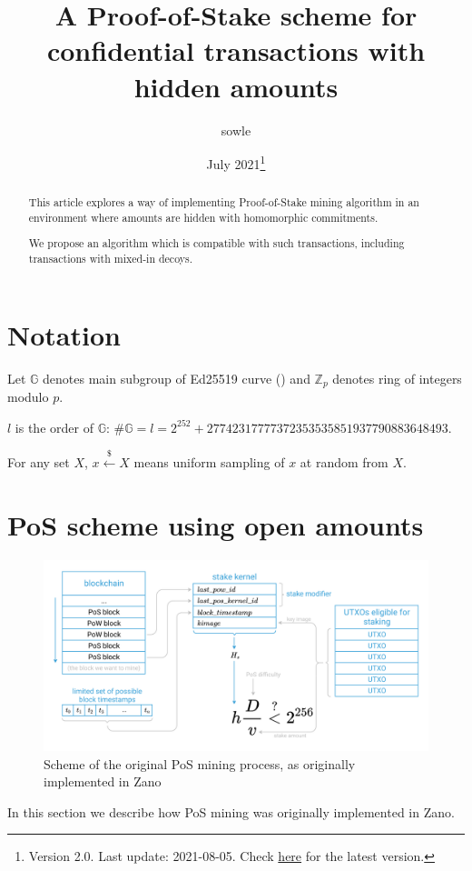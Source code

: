 \documentclass{article}
\title{\huge{\textbf{A Proof-of-Stake scheme for confidential transactions with hidden amounts}}}
\author{\large{sowle}}
\affil{\small{Zano project \\ \texttt{val@zano.org} \\ \url{https://zano.org}}}
\date{\small{July 2021\footnote{Version 2.0. Last update: 2021-08-05. Check \href{https://github.com/hyle-team/docs/tree/master/PoS/PoS_with_HA}{here} for the latest version.}}}
\numberwithin{figure}{section}
\begin{document}
\maketitle

\begin{abstract}
This article explores a way of implementing Proof-of-Stake mining algorithm in an environment where amounts are hidden with homomorphic commitments.

We propose an algorithm which is compatible with such transactions, including transactions with mixed-in decoys.
\end{abstract}

\section{Notation}
Let $\mathbb{G}$ denotes main subgroup of Ed25519 curve (\cite{ed25519_site}) and $\mathbb{Z}_p$ denotes ring of integers modulo $p$.

$l$ is the order of $\mathbb{G}$: $\#\mathbb{G} = l = 2^{252} + 27742317777372353535851937790883648493$.

For  any  set $X$, $x \stackrel{\$}{\leftarrow} X$ means uniform  sampling of $x$ at random from $X$. 



\section{PoS scheme using open amounts} \label{sec_open_amounts}

\begin{figure}[ht!]
\centering
\includegraphics[scale=0.665]{fig_1.png}
\caption{Scheme of the original PoS mining process, as originally implemented in Zano}
\label{fig:1.1}
\end{figure}

\indent
In this section we describe how PoS mining was originally implemented in Zano.
\end{document}
